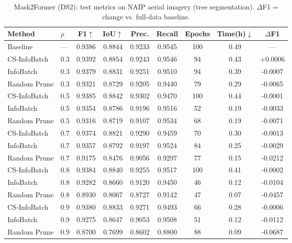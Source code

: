 \begin{table}[ht]
\centering
\small
\caption{Mask2Former (DS2): test metrics on NAIP aerial imagery (tree segmentation). $\Delta$F1 = change vs. full-data baseline.}
\label{tab:main_results_mask2former_(ds2)}
\begin{tabular}{llccccccc}
\toprule
Method & $\rho$ & F1$\uparrow$ & IoU$\uparrow$ & Prec. & Recall & Epochs & Time(h)$\downarrow$ & $\Delta$F1 \\
\midrule
Baseline & --- & 0.9386 & 0.8844 & 0.9233 & 0.9545 & 100 & 0.49 & --- \\
\midrule
CS-InfoBatch & 0.3 & 0.9392 & 0.8854 & 0.9243 & 0.9546 & 94 & 0.43 & +0.0006 \\
InfoBatch & 0.3 & 0.9379 & 0.8831 & 0.9251 & 0.9510 & 94 & 0.39 & -0.0007 \\
Random Prune & 0.3 & 0.9321 & 0.8729 & 0.9205 & 0.9440 & 79 & 0.29 & -0.0065 \\
\midrule
CS-InfoBatch & 0.5 & 0.9385 & 0.8842 & 0.9302 & 0.9470 & 100 & 0.44 & -0.0001 \\
InfoBatch & 0.5 & 0.9354 & 0.8786 & 0.9196 & 0.9516 & 52 & 0.19 & -0.0033 \\
Random Prune & 0.5 & 0.9316 & 0.8719 & 0.9107 & 0.9534 & 68 & 0.19 & -0.0071 \\
\midrule
CS-InfoBatch & 0.7 & 0.9374 & 0.8821 & 0.9290 & 0.9459 & 70 & 0.30 & -0.0013 \\
InfoBatch & 0.7 & 0.9357 & 0.8792 & 0.9197 & 0.9524 & 84 & 0.25 & -0.0029 \\
Random Prune & 0.7 & 0.9175 & 0.8476 & 0.9056 & 0.9297 & 77 & 0.15 & -0.0212 \\
\midrule
CS-InfoBatch & 0.8 & 0.9384 & 0.8840 & 0.9255 & 0.9517 & 100 & 0.41 & -0.0002 \\
InfoBatch & 0.8 & 0.9282 & 0.8660 & 0.9120 & 0.9450 & 46 & 0.12 & -0.0104 \\
Random Prune & 0.8 & 0.8930 & 0.8067 & 0.8727 & 0.9142 & 47 & 0.07 & -0.0457 \\
\midrule
CS-InfoBatch & 0.9 & 0.9380 & 0.8833 & 0.9271 & 0.9493 & 66 & 0.28 & -0.0006 \\
InfoBatch & 0.9 & 0.9275 & 0.8647 & 0.9053 & 0.9508 & 51 & 0.12 & -0.0112 \\
Random Prune & 0.9 & 0.8700 & 0.7699 & 0.8602 & 0.8800 & 88 & 0.09 & -0.0687 \\
\bottomrule
\end{tabular}
\end{table}